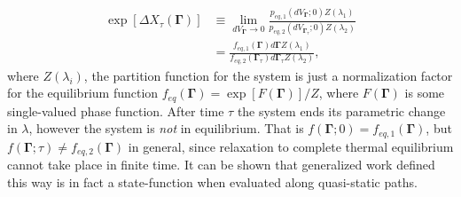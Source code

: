 \documentclass[a4paper,12pt]{article}
\begin{document}
\begin{equation}
\begin{aligned}
\label{GeneralizedWorkDef}
  \exp[\Delta X_{\tau}(\bm{\Gamma})] &\equiv \lim_{d V_{\bm{\Gamma}} \to 0} \frac{p_{eq,1} (d V_{\bm{\Gamma}};0)Z(\lambda_1)}{p_{eq,2} (d V_{\bm{\Gamma}_{\tau}};0)Z(\lambda_2)} \\
  &= \frac{f_{eq,1}(\bm{\Gamma}) d\bm{\Gamma} Z(\lambda_1)}{f_{eq,2}(\bm{\Gamma}_{\tau}) d\bm{\Gamma}_{\tau} Z(\lambda_2)},
\end{aligned}
\end{equation}
where $Z(\lambda_i)$, the partition function for the system is just a normalization factor for the equilibrium function $f_{eq}(\bm{\Gamma}) =\exp[F(\bm{\Gamma})]/Z$, where $F(\bm{\Gamma})$ is some single-valued phase function. After time $\tau$ the system ends its parametric change in $\lambda$, however the system is \textit{not} in equilibrium. That is $f(\bm{\Gamma};0)=f_{eq,1}(\bm{\Gamma})$, but $f(\bm{\Gamma};\tau)\neq f_{eq,2}(\bm{\Gamma})$ in general, since relaxation to complete thermal equilibrium cannot take place in finite time.
It can be shown that generalized work defined this way is in fact a state-function when evaluated along quasi-static paths.
\end{document}

